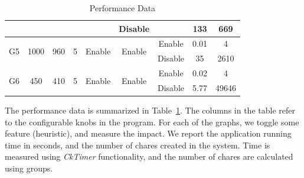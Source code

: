 \documentclass[10pt,oneside]{article}
\begin{document}
\begin{table}[h]
{\begin{tabular}{|c|c|c|c|c|c|c|c|c|}
                        &                       &                      &                     &                         & Disable                 &                         & 133                & 669      \\ \hline
    \multirow{2}{*}{G5} & \multirow{2}{*}{1000} & \multirow{2}{*}{960} & \multirow{2}{*}{5}  & \multirow{2}{*}{Enable} & \multirow{2}{*}{Enable} & Enable                  & 0.01               & 4        \\ \cline{7-9} 
                        &                       &                      &                     &                         &                         & Disable                 & 35                 & 2610     \\ \hline
    \multirow{2}{*}{G6} & \multirow{2}{*}{450}  & \multirow{2}{*}{410} & \multirow{2}{*}{5}  & \multirow{2}{*}{Enable} & \multirow{2}{*}{Enable} & Enable                  & 0.02           & 4        \\ \cline{7-9} 
                        &                       &                      &                     &                         &                         & Disable                 & 5.77           & 49646    \\ \hline
    \end{tabular}
  }
\caption{Performance Data}
\label{tb:2}
\end{table}

The performance data is summarized in Table~\ref{tb:2}. The columns in the table refer to the configurable knobs in the program. For each of the graphs, we toggle some feature (heuristic), and measure the impact. We report the 
application running time in seconds, and the number of chares created in the system. Time is measured using \emph{CkTimer} functionality, and the number of chares are calculated using groups.
\end{document}
